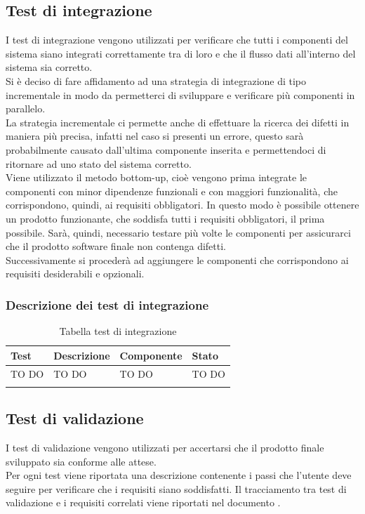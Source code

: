 	\subsection{Test di integrazione}
		I test di integrazione vengono utilizzati per verificare che tutti i componenti del sistema siano integrati correttamente tra di loro e che il flusso dati all'interno del sistema sia corretto.\\
		Si è deciso di fare affidamento ad una strategia di integrazione di tipo incrementale in modo da permetterci di sviluppare e verificare più componenti in parallelo.\\
		La strategia incrementale ci permette anche di effettuare la ricerca dei difetti in maniera più precisa, infatti nel caso si presenti un errore, questo sarà probabilmente causato dall'ultima componente inserita e permettendoci di ritornare ad uno stato del sistema corretto.\\
		Viene utilizzato il metodo bottom-up, cioè vengono prima integrate le componenti con minor dipendenze funzionali e con maggiori funzionalità, che corrispondono, quindi, ai requisiti obbligatori. In questo modo è possibile ottenere un prodotto funzionante, che soddisfa tutti i requisiti obbligatori, il prima possibile. Sarà, quindi, necessario testare più volte le componenti per assicurarci che il prodotto software finale non contenga difetti.\\ Successivamente si procederà ad aggiungere le componenti che corrispondono ai requisiti desiderabili e opzionali.
		 
		\subsubsection{Descrizione dei test di integrazione}
			\begin{center}

			\def\arraystretch{1.5}
			\bgroup
			\begin{longtable}{| p{2.5cm} | p{5cm} | p{3.5cm} | p{1.5cm} |}
					\hline
					\textbf{Test} & \textbf{Descrizione} & \textbf{Componente} & \textbf{Stato}\\
					\hline						
					TO DO & TO DO & TO DO & TO DO\\
					\hline
			\caption{Tabella test di integrazione}
			\end{longtable}
				\egroup
\end{center}

	\subsection{Test di validazione}
		I test di validazione vengono utilizzati per accertarsi che il prodotto finale sviluppato sia conforme alle attese.\\
		Per ogni test viene riportata una descrizione contenente i passi che l'utente deve seguire per verificare che i requisiti siano soddisfatti. Il tracciamento tra test di validazione e i requisiti correlati viene riportati nel documento \docNameVersionAdR.
		
